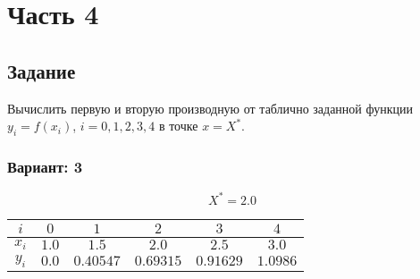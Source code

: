 \chapter*{Часть 4}

\section*{Задание}
Вычислить первую и вторую производную от таблично заданной функции
$y_i = f(x_i)$, $i=0,1,2,3,4$ в точке $x = X^*$.

\subsection*{Вариант: 3}

\begin{equation*}
    X^* = 2.0
\end{equation*}
\begin{center}
\begin{tabular}{|c|c|c|c|c|c|}
    \hline
    $i$ & $0$ & $1$ & $2$ & $3$ & $4$ \\
    \hline
    $x_i$ & $1.0$ & $1.5$ & $2.0$ & $2.5$ & $3.0$ \\
    \hline
    $y_i$ & $0.0$ & $0.40547$ & $0.69315$ & $0.91629$ & $1.0986$ \\
    \hline
\end{tabular}
\end{center}

\pagebreak